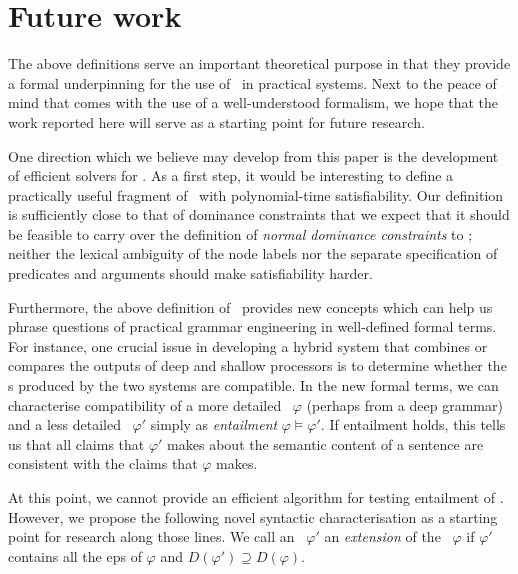 \section{Future work}
\label{sec:entailment}

The above definitions serve an important theoretical purpose in that
they provide a formal underpinning for the use of \rmrs\ in practical
systems.  Next to the peace of mind that comes with the use of a
well-understood formalism, we hope that the work reported here will
serve as a starting point for future research.

One direction which we believe may develop from this paper is the
development of efficient solvers for \rmrs.  As a first step, it would
be interesting to define a practically useful fragment of \rmrs\ with
polynomial-time satisfiability.  Our definition is sufficiently close
to that of dominance constraints that we expect that it should be
feasible to carry over the definition of \emph{normal dominance
  constraints} \cite{Althaus_etal:JoA} to \rmrs; neither the lexical
ambiguity of the node labels nor the separate specification of
predicates and arguments should make satisfiability harder.

Furthermore, the above definition of \rmrs\ provides new concepts
which can help us phrase questions of practical grammar engineering in
well-defined formal terms.  For instance, one crucial issue in
developing a hybrid system that combines or compares the outputs of
deep and shallow processors is to determine whether the \rmrs s
produced by the two systems are compatible.  In the new formal terms,
we can characterise compatibility of a more detailed \rmrs\ $\varphi$
(perhaps from a deep grammar) and a less detailed \rmrs\ $\varphi'$
simply as \emph{entailment} $\varphi \models \varphi'$.  If entailment
holds, this tells us that all claims that $\varphi'$ makes about the
semantic content of a sentence are consistent with the claims that
$\varphi$ makes.

At this point, we cannot provide an efficient algorithm for testing
entailment of \rmrs.  However, we propose the following novel
syntactic characterisation as a starting point for research along
those lines. We call an \rmrs\ $\varphi'$ an \emph{extension} of the
\rmrs\ $\varphi$ if $\varphi'$ contains all the {\sc ep}s of $\varphi$ and
$D(\varphi') \supseteq D(\varphi)$.

